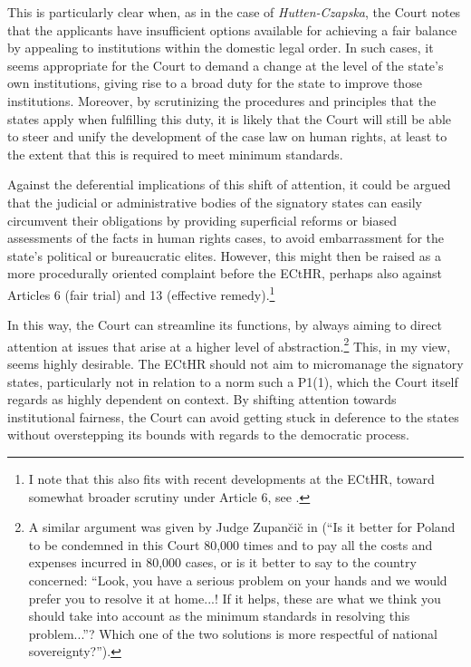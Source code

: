 This is particularly clear when, as in the case of {\it Hutten-Czapska}, the Court notes that the applicants have insufficient options available for achieving a fair balance by appealing to institutions within the domestic legal order. In such cases, it seems appropriate for the Court to demand a change at the level of the state's own institutions, giving rise to a broad duty for the state to improve those institutions. Moreover, by scrutinizing the procedures and principles that the states apply when fulfilling this duty, it is likely that the Court will still be able to steer and unify the development of the case law on human rights, at least to the extent that this is required to meet minimum standards.

Against the deferential implications of this shift of attention, it could be argued that the judicial or administrative bodies of the signatory states can easily circumvent their obligations by providing superficial reforms or biased assessments of the facts in human rights cases, to avoid embarrassment for the state's political or bureaucratic elites. However, this might then be raised as a more procedurally oriented complaint before the ECtHR, perhaps also against Articles 6 (fair trial) and 13 (effective remedy).\footnote{I note that this also fits with recent developments at the ECtHR, toward somewhat broader scrutiny under Article 6, see \cite{khamidov07}.}  

In this way, the Court can streamline its functions, by always aiming to direct attention at issues that arise at a higher level of abstraction.\footnote{A similar argument was given by Judge Zupan\u{c}i\u{c} in \cite{hutten06} (``Is it better for Poland to be condemned in this Court 80,000 times and to pay all the costs and expenses incurred in 80,000 cases, or is it better to say to the country concerned: “Look, you have a serious problem on your hands and we would prefer you to resolve it at home...! If it helps, these are what we think you should take into account as the minimum standards in resolving this problem...”? Which one of the two solutions is more respectful of national sovereignty?'').} This, in my view, seems highly desirable. The ECtHR should not aim to micromanage the signatory states, particularly not in relation to a norm such a P1(1), which the Court itself regards as highly dependent on context. By shifting attention towards institutional fairness, the Court can avoid getting stuck in deference to the states without overstepping its bounds with regards to the democratic process.

